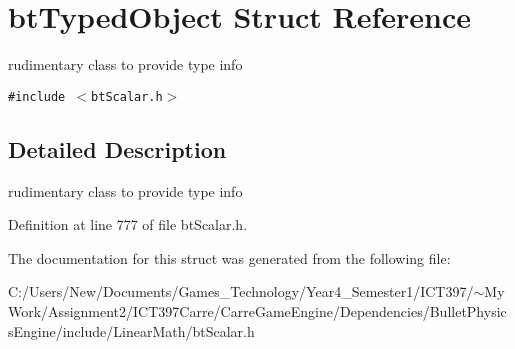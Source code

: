 \hypertarget{structbt_typed_object}{
\section{btTypedObject Struct Reference}
\label{structbt_typed_object}
}
rudimentary class to provide type info  


{\tt \#include $<$btScalar.h$>$}



\subsection{Detailed Description}
rudimentary class to provide type info 

Definition at line 777 of file btScalar.h.

The documentation for this struct was generated from the following file:\begin{CompactItemize}
\item 
C:/Users/New/Documents/Games\_\-Technology/Year4\_\-Semester1/ICT397/$\sim$My Work/Assignment2/ICT397Carre/CarreGameEngine/Dependencies/BulletPhysicsEngine/include/LinearMath/btScalar.h\end{CompactItemize}
